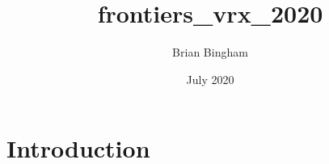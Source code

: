 \documentclass{article}
\title{frontiers_vrx_2020}
\author{Brian Bingham}
\date{July 2020}
\begin{document}
\maketitle

\section{Introduction}
\end{document}
